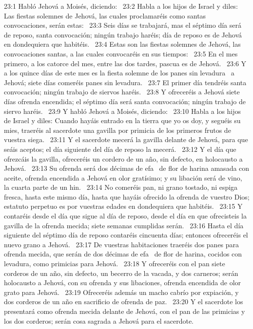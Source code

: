 23:1 Habló Jehová a Moisés, diciendo:  
23:2 Habla a los hijos de Israel y diles: Las fiestas solemnes de Jehová, las cuales proclamaréis como santas convocaciones, serán estas:  
23:3 Seis días se trabajará, mas el séptimo día será de reposo, santa convocación; ningún trabajo haréis; día de reposo es de Jehová en dondequiera que habitéis.  
23:4 Estas son las fiestas solemnes de Jehová, las convocaciones santas, a las cuales convocaréis en sus tiempos:  
23:5 En el mes primero, a los catorce del mes, entre las dos tardes, pascua es de Jehová.  
23:6 Y a los quince días de este mes es la fiesta solemne de los panes sin levadura  a Jehová; siete días comeréis panes sin levadura.  
23:7 El primer día tendréis santa convocación; ningún trabajo de siervos haréis.  
23:8 Y ofreceréis a Jehová siete días ofrenda encendida; el séptimo día será santa convocación; ningún trabajo de siervo haréis.  
23:9 Y habló Jehová a Moisés, diciendo:  
23:10 Habla a los hijos de Israel y diles: Cuando hayáis entrado en la tierra que yo os doy, y seguéis su mies, traeréis al sacerdote una gavilla por primicia de los primeros frutos de vuestra siega.  
23:11 Y el sacerdote mecerá la gavilla delante de Jehová, para que seáis aceptos; el día siguiente del día de reposo la mecerá.  
23:12 Y el día que ofrezcáis la gavilla, ofreceréis un cordero de un año, sin defecto, en holocausto a Jehová.  
23:13 Su ofrenda será dos décimas de efa  de flor de harina amasada con aceite, ofrenda encendida a Jehová en olor gratísimo; y su libación será de vino, la cuarta parte de un hin.  
23:14 No comeréis pan, ni grano tostado, ni espiga fresca, hasta este mismo día, hasta que hayáis ofrecido la ofrenda de vuestro Dios; estatuto perpetuo es por vuestras edades en dondequiera que habitéis.  
23:15 Y contaréis desde el día que sigue al día de reposo, desde el día en que ofrecisteis la gavilla de la ofrenda mecida; siete semanas cumplidas serán.  
23:16 Hasta el día siguiente del séptimo día de reposo contaréis cincuenta días; entonces ofreceréis el nuevo grano a Jehová.  
23:17 De vuestras habitaciones traeréis dos panes para ofrenda mecida, que serán de dos décimas de efa  de flor de harina, cocidos con levadura, como primicias para Jehová.  
23:18 Y ofreceréis con el pan siete corderos de un año, sin defecto, un becerro de la vacada, y dos carneros; serán holocausto a Jehová, con su ofrenda y sus libaciones, ofrenda encendida de olor grato para Jehová.  
23:19 Ofreceréis además un macho cabrío por expiación, y dos corderos de un año en sacrificio de ofrenda de paz.  
23:20 Y el sacerdote los presentará como ofrenda mecida delante de Jehová, con el pan de las primicias y los dos corderos; serán cosa sagrada a Jehová para el sacerdote.  
